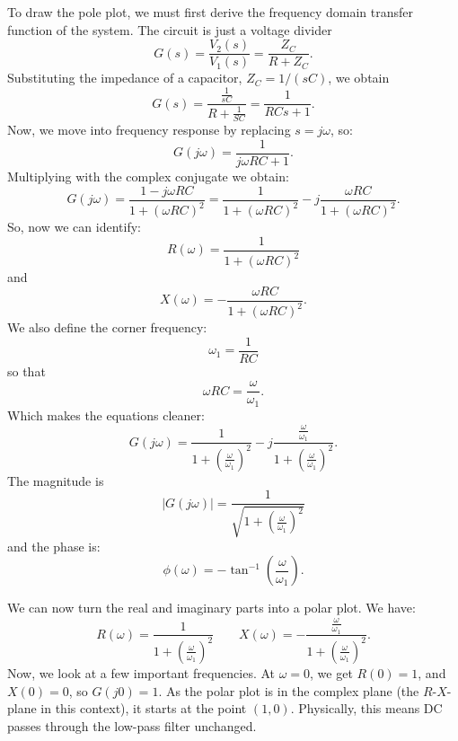 To draw the pole plot, we must first derive the frequency domain transfer function of the system.
The circuit is just a voltage divider
\begin{equation*}
  G(s) = \frac{V_2(s)}{V_1(s)} = \frac{Z_C}{R + Z_C}
.\end{equation*}
Substituting the impedance of a capacitor, $Z_C = 1 /(sC)$, we obtain
\begin{equation*}
  G(s) = \frac{\frac{1}{sC}}{R + \frac{1}{SC}} = \frac{1}{RCs + 1}
.\end{equation*}
Now, we move into frequency response by replacing $s = j\omega$, so:
\begin{equation*}
  G(j\omega) = \frac{1}{j\omega RC + 1}
.\end{equation*}
Multiplying with the complex conjugate we obtain:
\begin{equation*}
  G(j\omega) = \frac{1-j\omega RC}{1 + \left( \omega RC \right)^2} = \frac{1}{1 + \left( \omega RC \right)^2} - j \frac{\omega RC}{1 + \left( \omega RC \right)^2}
.\end{equation*}
So, now we can identify:
\begin{equation*}
  R(\omega) = \frac{1}{1 + \left( \omega RC \right)^2}
\end{equation*}
and
\begin{equation*}
  X(\omega) = - \frac{\omega RC}{1 + \left( \omega RC \right)^2}
.\end{equation*}
We also define the corner frequency:
\begin{equation*}
  \omega_1 = \frac{1}{RC}
\end{equation*}
so that
\begin{equation*}
  \omega RC = \frac{\omega}{\omega_1}
.\end{equation*}
Which makes the equations cleaner:
\begin{equation*}
  G(j\omega) = \frac{1}{1 + \left( \frac{\omega}{\omega_1} \right)^2} - j \frac{\frac{\omega}{\omega_1}}{1 + \left( \frac{\omega}{\omega_1} \right)^2}
.\end{equation*}
The magnitude is
\begin{equation*}
  \left| G(j\omega) \right| = \frac{1}{\sqrt{1 + \left( \frac{\omega}{\omega_1} \right)^2}}
\end{equation*}
and the phase is:
\begin{equation*}
  \phi(\omega) = - \tan^{-1} \left( \frac{\omega}{\omega_1} \right)
.\end{equation*}

We can now turn the real and imaginary parts into a polar plot.
We have:
\begin{equation*}
  R(\omega) = \frac{1}{1 + \left( \frac{\omega}{\omega_1} \right)^2} \qquad X(\omega) = - \frac{\frac{\omega}{\omega_1}}{1 + \left( \frac{\omega}{\omega_1} \right)^2}
.\end{equation*}
Now, we look at a few important frequencies.
At $\omega = 0$, we get $R(0) = 1$, and $X(0) = 0$, so $G(j0) = 1$.
As the polar plot is in the complex plane (the $R$-$X$-plane in this context), it starts at the point $(1,0)$.
Physically, this means DC passes through the low-pass filter unchanged.

